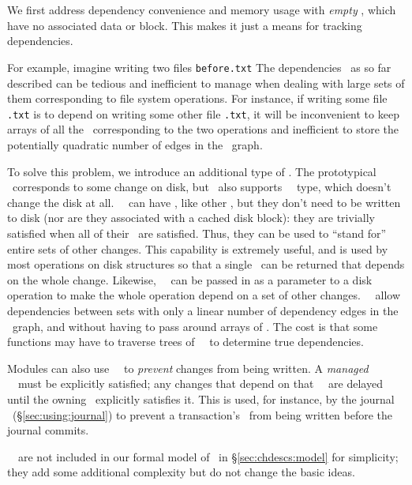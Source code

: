 
\subsection{\Noop\ \ChDescs}
\label{sec:chdescs:noop}

We first address dependency convenience and memory usage with \emph{empty
\patches}, which have no associated data or block.
%
This makes it just a means for tracking dependencies.


For example, imagine writing two files \texttt{before.txt}
The dependencies 
\Chdescs\ as so far described can be tedious and inefficient to manage when
dealing with large sets of them corresponding to file system operations. For
instance, if writing some file \texttt{\after.txt} is to depend on writing some
other file \texttt{\before.txt}, it will be inconvenient to keep arrays of all
the \chdescs\ corresponding to the two operations and inefficient to store the
potentially quadratic number of edges in the \chdesc\ graph.

To solve this problem, we introduce an additional type of \chdesc. The
prototypical \chdesc\ corresponds to some change on disk, but \Kudos\ also
supports \aemphnoop\ \chdesc\ type, which doesn't change the disk at all.
\Noop\ \chdescs\ can have \befores, like other \chdescs, but they don't need to
be written to disk (nor are they associated with a cached disk block): they are
trivially satisfied when all of their \befores\ are satisfied. Thus, they can be
used to ``stand for'' entire sets of other changes.
%
This capability is extremely useful, and is used by most operations on disk
structures so that a single \chdesc\ can be returned that depends on the whole
change. Likewise, \anoop\ \chdesc\ can be passed in as a parameter to a disk
operation to make the whole operation depend on a set of other changes. \Noop\
\chdescs\ allow dependencies between sets with only a linear number of
dependency edges in the \chdesc\ graph, and without having to pass around arrays
of \chdescs.
%
The cost is that some functions may have to traverse trees of \noop\ \chdescs\
to determine true dependencies.

Modules can also use \noop\ \chdescs\ to \emph{prevent} changes from being
written. A \emph{managed} \noop\ \chdesc\ must be explicitly satisfied; any
changes that depend on that \noop\ \chdesc\ are delayed until the owning \module\
explicitly satisfies it. This is used, for instance, by the journal \module\
(\S\ref{sec:using:journal}) to prevent a transaction's \chdescs\ from
being written before the journal commits.

\Noop\ \chdescs\ are not included in our formal model of \chdescs\ in
\S\ref{sec:chdescs:model} for simplicity; they add some additional complexity
but do not change the basic ideas.
